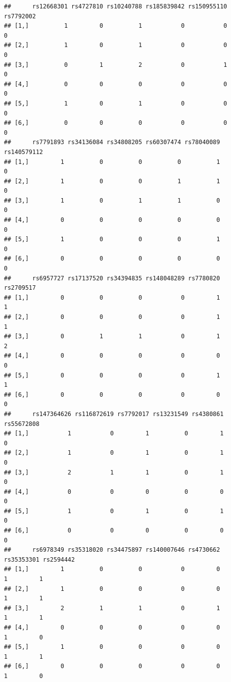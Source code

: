 \documentclass[
]{article}
\begin{document}
\begin{verbatim}
##      rs12668301 rs4727810 rs10240788 rs185839842 rs150955110 rs7792002
## [1,]          1         0          1           0           0         0
## [2,]          1         0          1           0           0         0
## [3,]          0         1          2           0           1         0
## [4,]          0         0          0           0           0         0
## [5,]          1         0          1           0           0         0
## [6,]          0         0          0           0           0         0
##      rs7791893 rs34136084 rs34808205 rs60307474 rs78040089 rs140579112
## [1,]         1          0          0          0          1           0
## [2,]         1          0          0          1          1           0
## [3,]         1          0          1          1          0           0
## [4,]         0          0          0          0          0           0
## [5,]         1          0          0          0          1           0
## [6,]         0          0          0          0          0           0
##      rs6957727 rs17137520 rs34394835 rs148048289 rs7780820 rs2709517
## [1,]         0          0          0           0         1         1
## [2,]         0          0          0           0         1         1
## [3,]         0          1          1           0         1         2
## [4,]         0          0          0           0         0         0
## [5,]         0          0          0           0         1         1
## [6,]         0          0          0           0         0         0
##      rs147364626 rs116872619 rs7792017 rs13231549 rs4380861 rs55672808
## [1,]           1           0         1          0         1          0
## [2,]           1           0         1          0         1          0
## [3,]           2           1         1          0         1          0
## [4,]           0           0         0          0         0          0
## [5,]           1           0         1          0         1          0
## [6,]           0           0         0          0         0          0
##      rs6978349 rs35318020 rs34475897 rs140007646 rs4730662 rs35353301 rs2594442
## [1,]         1          0          0           0         0          1         1
## [2,]         1          0          0           0         0          1         1
## [3,]         2          1          1           0         1          1         1
## [4,]         0          0          0           0         0          1         0
## [5,]         1          0          0           0         0          1         1
## [6,]         0          0          0           0         0          1         0

\end{verbatim}
\end{document}

